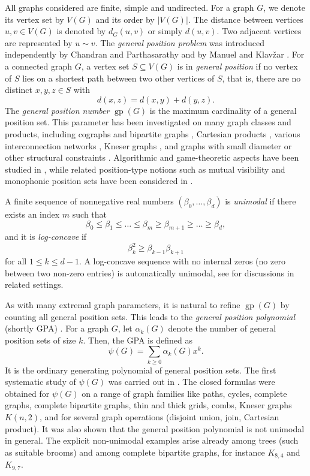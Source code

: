 \documentclass[12pt,twoside]{article}
\begin{document}
All graphs considered are finite, simple and undirected. For a graph $G$, we denote its vertex set by $V(G)$ and its order by $|V(G)|$. The distance between vertices $u,v\in V(G)$ is denoted by $d_G(u,v)$ or simply $d(u,v)$. Two adjacent vertices are represented by $u\sim v.$
The \emph{general position problem} was introduced independently by Chandran and Parthasarathy \cite{7} and by Manuel and Klav\v{z}ar \cite{20}. For a connected graph $G$, a vertex set $S\subseteq V(G)$ is in \emph{general position} if no vertex of $S$ lies on a shortest path between two other vertices of $S$, that is, there are no distinct $x,y,z\in S$ with \[
d(x,z)=d(x,y)+d(y,z).
\]
The \emph{general position number} $\operatorname{gp}(G)$ is the maximum
cardinality of a general position set. This parameter has been investigated on
many graph classes and products, including cographs and bipartite graphs
\cite{4}, Cartesian products \cite{17,18,23}, various interconnection networks
\cite{21}, Kneser graphs \cite{10,22}, and graphs with small diameter or other
structural constraints \cite{20,21,26}. Algorithmic and game-theoretic aspects
have been studied in \cite{15,16}, while related position-type notions such as
mutual visibility and monophonic position sets have been considered in
\cite{9,24,25}. 

A finite sequence of nonnegative real numbers \((\beta_0,\dots,\beta_d)\) is \emph{unimodal} if there exists an index \(m\) such that
\[
\beta_0\le \beta_1\le \dots\le \beta_m\ge \beta_{m+1}\ge \dots\ge \beta_d,
\]
and it is \emph{log-concave} if
\[
\beta_k^2 \ge \beta_{k-1}\beta_{k+1}
\]
for all \(1\le k\le d-1\). A log-concave sequence with no internal zeros (no zero between two non-zero entries) is automatically unimodal, see \cite{1,8,11,13,14} for discussions in related settings.

As with many extremal graph parameters, it is natural to refine
$\operatorname{gp}(G)$ by counting all general position sets. This leads to
the \emph{general position polynomial} (shortly GPA) \cite{0}. For a graph $G$, let $\alpha_k(G)$ denote
the number of general position sets of size $k$. Then, the GPA is defined as
\[
\psi(G)=\sum_{k\ge 0} \alpha_k(G) x^k.
\]
It is the ordinary generating polynomial of general position sets. %
The first systematic study of $\psi(G)$ was carried out in \cite{0}. The closed formulas were obtained for $\psi(G)$ on a range of graph
families  like paths, cycles, complete graphs, complete bipartite graphs, thin and
thick grids, combs, Kneser graphs $K(n,2)$, and for several graph operations
(disjoint union, join, Cartesian product). It was also shown that the general
position polynomial is not unimodal in general. The explicit non-unimodal
examples arise already among trees (such as suitable brooms) and among
complete bipartite graphs, for instance $K_{8,4}$ and $K_{9,7}$.
\end{document}
